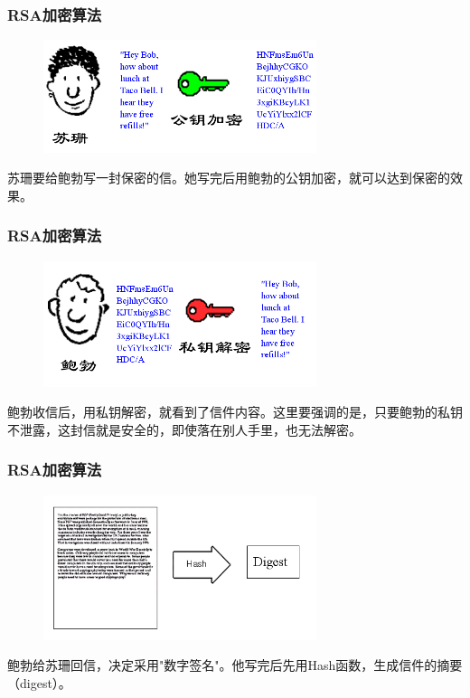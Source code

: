 \documentclass[slidestop,compress,mathserif]{beamer}
\begin{document}
\begin{frame}
  \transboxout
  \frametitle{RSA加密算法}
  \begin{center}
    \begin{figure}
      \includegraphics[width=8cm]{bg3}
    \end{figure}
    苏珊要给鲍勃写一封保密的信。她写完后用鲍勃的公钥加密，就可以达到保密的效果。
  \end{center}
\end{frame}

\begin{frame}
  \transboxout
  \frametitle{RSA加密算法}
  \begin{center}
    \begin{figure}
      \includegraphics[width=8cm]{bg4}
    \end{figure}
    鲍勃收信后，用私钥解密，就看到了信件内容。这里要强调的是，只要鲍勃的私钥不泄露，这封信就是安全的，即使落在别人手里，也无法解密。
  \end{center}
\end{frame}

\begin{frame}
  \transboxout
  \frametitle{RSA加密算法}
  \begin{center}
    \begin{figure}
      \includegraphics[width=8cm]{bg5}
    \end{figure}
    鲍勃给苏珊回信，决定采用"数字签名"。他写完后先用Hash函数，生成信件的摘要（digest）。
  \end{center}
\end{frame}
\end{document}
